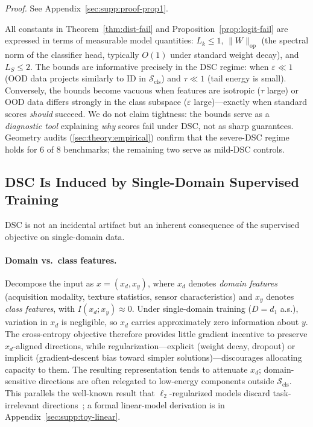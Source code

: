 \documentclass[runningheads]{llncs}
\begin{document}
\noindent\emph{Proof.} See Appendix~\ref{sec:supp:proof-prop1}.

\begin{remark}\label{rem:tightness}
All constants in Theorem~\ref{thm:dist-fail} and Proposition~\ref{prop:logit-fail} are expressed in terms of measurable model quantities: $L_k \le 1$, $\|W\|_{\mathrm{op}}$ (the spectral norm of the classifier head, typically $O(1)$ under standard weight decay), and $L_S \le 2$.
The bounds are informative precisely in the DSC regime: when $\varepsilon \ll 1$ (OOD data projects similarly to ID in $\mathcal{S}_{\mathrm{cls}}$) and $\tau \ll 1$ (tail energy is small).
Conversely, the bounds become vacuous when features are isotropic ($\tau$ large) or OOD data differs strongly in the class subspace ($\varepsilon$ large)---exactly when standard scores \emph{should} succeed.
We do not claim tightness: the bounds serve as a \emph{diagnostic tool} explaining \emph{why} scores fail under DSC, not as sharp guarantees.
Geometry audits (\cref{sec:theory:empirical}) confirm that the severe-DSC regime holds for 6 of 8 benchmarks; the remaining two serve as mild-DSC controls.
\end{remark}

\subsection{DSC Is Induced by Single-Domain Supervised Training}
\label{sec:theory:cause}

DSC is not an incidental artifact but an inherent consequence of the supervised objective on single-domain data.

\paragraph{Domain vs.\ class features.}
Decompose the input as $x = (x_d, x_y)$, where $x_d$ denotes \emph{domain features} (acquisition modality, texture statistics, sensor characteristics) and $x_y$ denotes \emph{class features}, with $I(x_d; x_y) \approx 0$.
Under single-domain training ($D{=}d_1$ a.s.), variation in $x_d$ is negligible, so $x_d$ carries approximately zero information about $y$.
The cross-entropy objective therefore provides little gradient incentive to preserve $x_d$-aligned directions, while regularization---explicit (weight decay, dropout) or implicit (gradient-descent bias toward simpler solutions)---discourages allocating capacity to them.
The resulting representation tends to attenuate $x_d$; domain-sensitive directions are often relegated to low-energy components outside $\mathcal{S}_{\mathrm{cls}}$.
This parallels the well-known result that $\ell_2$-regularized models discard task-irrelevant directions~\cite{Jing2022rank}; a formal linear-model derivation is in Appendix~\ref{sec:supp:toy-linear}.
\end{document}

